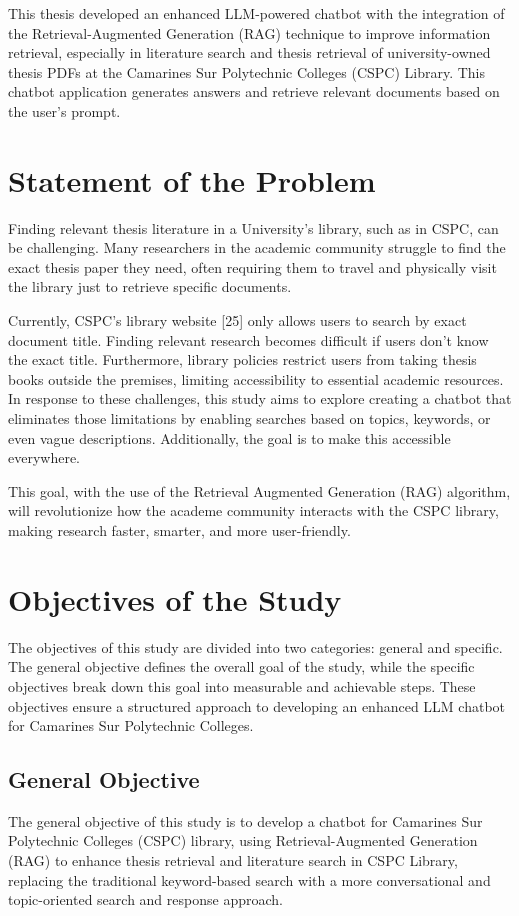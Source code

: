 \begin{refsection}
\bigbreak
This thesis developed an enhanced LLM-powered chatbot with the integration of the Retrieval-Augmented Generation (RAG) technique to improve information retrieval, especially in literature search and thesis retrieval of university-owned thesis PDFs at the Camarines Sur Polytechnic Colleges (CSPC) Library. This chatbot application generates answers and retrieve relevant documents based on the user's prompt.


\section{Statement of the Problem}

Finding relevant thesis literature in a University's library, such as in CSPC, can be challenging. Many researchers in the academic community struggle to find the exact thesis paper they need, often requiring them to travel and physically visit the library just to retrieve specific documents.

\bigbreak
Currently, CSPC’s library website [25] only allows users to search by exact document title. Finding relevant research becomes difficult if users don’t know the exact title. Furthermore, library policies restrict users from taking thesis books outside the premises, limiting accessibility to essential academic resources. In response to these challenges, this study aims to explore creating a chatbot that eliminates those limitations by enabling searches based on topics, keywords, or even vague descriptions. Additionally, the goal is to make this accessible everywhere.

This goal, with the use of the Retrieval Augmented Generation (RAG) algorithm, will revolutionize how the academe community interacts with the CSPC library, making research faster, smarter, and more user-friendly. 


\section{Objectives of the Study}
The objectives of this study are divided into two categories: general and specific. The general objective defines the overall goal of the study, while the specific objectives break down this goal into measurable and achievable steps. These objectives ensure a structured approach to developing an enhanced LLM chatbot for Camarines Sur Polytechnic Colleges. 

\subsection{General Objective}
The general objective of this study is to develop a chatbot for  Camarines Sur Polytechnic Colleges (CSPC) library, using Retrieval-Augmented Generation (RAG) to enhance thesis retrieval and literature search in CSPC Library, replacing the traditional keyword-based search with a more conversational and topic-oriented search and response approach.


\end{refsection}
